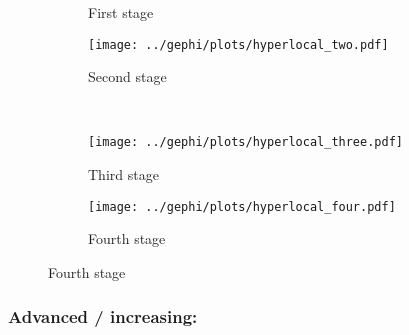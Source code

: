 \documentclass[a4paper, abstract=on]{scrartcl}
\begin{document}
      \begin{figure}[H]
        \caption{Social network of diffusion for  over time.}
        \centering
        \begin{subfigure}{.45\linewidth}
          \caption{First stage}
          \centering
        \end{subfigure}
        \begin{subfigure}{.45\linewidth}
          \caption{Second stage}
          \centering
          \texttt{[image: ../gephi/plots/hyperlocal\_two.pdf]}
        \end{subfigure}\\
        \begin{subfigure}{.45\linewidth}
          \caption{Third stage}
          \centering
          \texttt{[image: ../gephi/plots/hyperlocal\_three.pdf]}
        \end{subfigure}
        \begin{subfigure}{.45\linewidth}
          \caption{Fourth stage}
          \centering
          \texttt{[image: ../gephi/plots/hyperlocal\_four.pdf]}
        \end{subfigure}
      \end{figure}

    \subsubsection{Advanced / increasing: }
\end{document}
